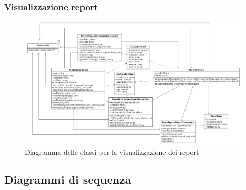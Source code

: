 \subsubsection{Visualizzazione report}
\begin{figure}[H]
	\centering
	\includegraphics[width=18cm]{res/images/webapp-report-diagrammaClassi.png}
	\caption{Diagramma delle classi per la visualizzazione dei report}
	\label{fig:DiagrammaClassiReport}
\end{figure}

\subsection{Diagrammi di sequenza}
